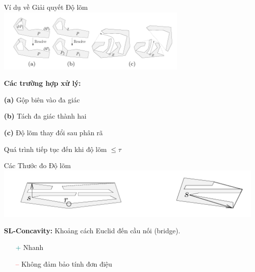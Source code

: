 \documentclass[aspectratio=169]{beamer}
\begin{document}
\begin{frame}{Ví dụ về Giải quyết Độ lõm}
    \centering
    \includegraphics[width=0.7\textwidth]{../imgs/ACD-3.png}

    \vspace{0.5em}
    \textbf{Các trường hợp xử lý:}
    
    \textbf{(a)} Gộp biên vào đa giác

    \textbf{(b)} Tách đa giác thành hai

    \textbf{(c)} Độ lõm thay đổi sau phân rã

    \vspace{0.2cm}
    Quá trình tiếp tục đến khi độ lõm $\leq \tau$
\end{frame}




\begin{frame}{Các Thước đo Độ lõm}
    \centering
    \includegraphics[width=0.8\linewidth]{../imgs/ACD-2.png}

    \vspace{0.5em}
    \textbf{SL-Concavity:} Khoảng cách Euclid đến cầu nối (bridge).
    \begin{itemize}
        \item[\textcolor{teal}{+}] Nhanh
        \item[\textcolor{red}{--}] Không đảm bảo tính đơn điệu
    \end{itemize}

\end{frame}
\end{document}
